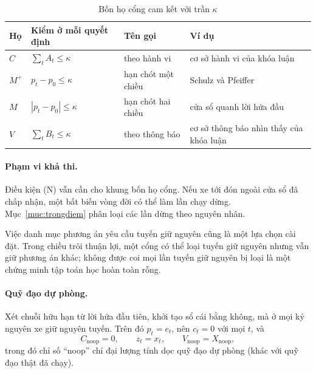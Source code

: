 \begin{table}[htbp]
\centering
\caption{Bốn họ cổng cam kết với trần $\kappa$}
\label{bang:hocong}
\small
\begin{tabularx}{\linewidth}{@{}llXX@{}}
\toprule
\textbf{Họ} & \textbf{Kiểm ở mỗi quyết định} & \textbf{Tên gọi} & \textbf{Ví dụ}\\
\midrule
$C$ & $\sum_t A_t \le \kappa$ & theo hành vi & cơ sở hành vi của khóa luận\\
$M^{+}$ & $p_t - p_0 \le \kappa$ & hạn chót một chiều & Schulz và Pfeiffer \cite{schulz2026}\\
$M$ & $|p_t - p_0| \le \kappa$ & hạn chót hai chiều & cửa sổ quanh lời hứa đầu\\
$V$ & $\sum_t B_t \le \kappa$ & theo thông báo & cơ sở thông báo nhìn thấy của khóa luận\\
\bottomrule
\end{tabularx}
\end{table}

\paragraph{Phạm vi khả thi.}
Điều kiện (N) vẫn cần cho khung bốn họ cổng. Nếu xe tới đón ngoài cửa sổ đã chấp nhận,
một bất biến vòng đời có thể làm lần chạy dừng. Mục~\ref{muc:trongdiem} phân loại các lần
dừng theo nguyên nhân.

Việc danh mục phương án yêu cầu tuyến giữ nguyên cũng là một lựa chọn cài đặt. Trong chiều
trôi thuận lợi, một cổng có thể loại tuyến giữ nguyên nhưng vẫn giữ phương án khác; không
được coi mọi lần tuyến giữ nguyên bị loại là một chứng minh tập toán học hoàn toàn rỗng.

\paragraph{Quỹ đạo dự phòng.} Xét chuỗi hữu hạn từ lời hứa đầu tiên, khởi tạo sổ cái bằng
không, mà ở mọi kỷ nguyên xe giữ nguyên tuyến. Trên đó
$p_t = e_t$, nên $c_t = 0$ với mọi $t$, và
\[
C_{\text{noop}} = 0, \qquad z_t = x_t, \qquad V_{\text{noop}} = X_{\text{noop}} ,
\]
trong đó chỉ số ``noop'' chỉ đại lượng tính dọc quỹ đạo dự phòng (khác với quỹ đạo thật đã chạy).

